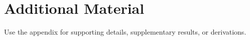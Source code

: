 \section{Additional Material}
Use the appendix for supporting details, supplementary results, or derivations.

